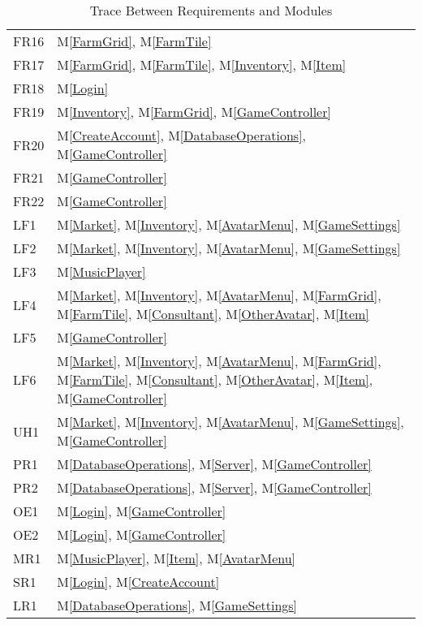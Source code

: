 \documentclass[12pt, titlepage]{article}
\newcommand{\mref}[1]{M\ref{#1}}
\begin{document}
\begin{table}[H]
\begin{tabular}{p{} p{}}
FR16 & \mref{FarmGrid}, \mref{FarmTile}\\
FR17 & \mref{FarmGrid}, \mref{FarmTile}, \mref{Inventory}, \mref{Item}\\
FR18 & \mref{Login}\\
FR19 & \mref{Inventory}, \mref{FarmGrid}, \mref{GameController}\\
FR20 & \mref{CreateAccount}, \mref{DatabaseOperations}, \mref{GameController}\\
FR21 & \mref{GameController}\\
FR22 & \mref{GameController}\\
LF1& \mref{Market}, \mref{Inventory}, \mref{AvatarMenu}, \mref{GameSettings}\\
LF2& \mref{Market}, \mref{Inventory}, \mref{AvatarMenu}, \mref{GameSettings}\\
LF3& \mref{MusicPlayer}\\
LF4& \mref{Market}, \mref{Inventory}, \mref{AvatarMenu}, \mref{FarmGrid}, \mref{FarmTile}, \mref{Consultant}, \mref{OtherAvatar}, \mref{Item}\\
LF5& \mref{GameController}\\
LF6 &\mref{Market}, \mref{Inventory}, \mref{AvatarMenu}, \mref{FarmGrid}, \mref{FarmTile}, \mref{Consultant}, \mref{OtherAvatar}, \mref{Item}, \mref{GameController}\\
UH1& \mref{Market}, \mref{Inventory}, \mref{AvatarMenu}, \mref{GameSettings}, \mref{GameController}\\
PR1& \mref{DatabaseOperations}, \mref{Server}, \mref{GameController}\\
PR2& \mref{DatabaseOperations}, \mref{Server}, \mref{GameController}\\
OE1& \mref{Login}, \mref{GameController}\\
OE2& \mref{Login}, \mref{GameController}\\
MR1& \mref{MusicPlayer}, \mref{Item}, \mref{AvatarMenu}\\
SR1& \mref{Login}, \mref{CreateAccount}\\
LR1 & \mref{DatabaseOperations}, \mref{GameSettings}\\
\bottomrule
\end{tabular}
\caption{Trace Between Requirements and Modules}
\label{TblRT}
\end{table}
\end{document}
